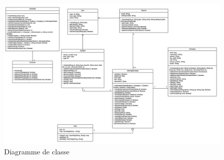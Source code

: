 \documentclass{scrreprt}
\begin{document}
\begin{figure}[!h]
\centering
\includegraphics[width=15cm]{images/classDiagram.png}
\caption{Diagramme de classe}
\end{figure}
\end{document}
